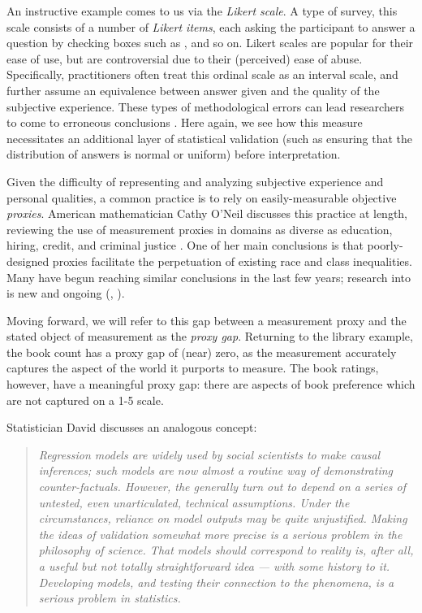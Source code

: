 \bigskip

An instructive example comes to us via the \textit{Likert scale}. 
A type of survey, this scale consists of a number of \textit{Likert items}, each asking the participant to answer a question by checking boxes such as ,  and so on.
Likert scales are popular for their ease of use, but are controversial due to their (perceived) ease of abuse.
Specifically, practitioners often treat this ordinal scale as an interval scale, and further assume an equivalence between answer given and the quality of the subjective experience.
These types of methodological errors can lead researchers to come to erroneous conclusions \citep{jamieson:2004}.
Here again, we see how this measure necessitates an additional layer of statistical validation (such as ensuring that the distribution of answers is normal or uniform) before interpretation. 

\bigskip

Given the difficulty of representing and analyzing subjective experience and personal qualities, a common practice is to rely on easily-measurable objective \textit{proxies}.
American mathematician Cathy O'Neil discusses this practice at length, reviewing the use of measurement proxies in domains as diverse as education, hiring, credit, and criminal justice \citep{oneil}.
One of her main conclusions is that poorly-designed proxies facilitate the perpetuation of existing race and class inequalities.
Many have begun reaching similar conclusions in the last few years; research into  is new and ongoing (\cite{tramer}, \cite{friedler}).

Moving forward, we will refer to this gap between a measurement proxy and the stated object of measurement as the \textit{proxy gap}.
Returning to the library example, the book count has a proxy gap of (near) zero, as the measurement accurately captures the aspect of the world it purports to measure.
The book ratings, however, have a meaningful proxy gap: there are aspects of book preference which are not captured on a 1-5 scale.

Statistician David \citet{freedman} discusses an analogous concept:

\begin{quotation}
\textit{
	Regression models are widely used by social scientists to make causal inferences; such models are now almost a routine way of demonstrating counter-factuals.
	However, the  generally turn out to depend on a series of untested, even unarticulated, technical assumptions.
	Under the circumstances, reliance on model outputs may be quite unjustified.
	Making the ideas of validation somewhat more precise is a serious problem in the philosophy of science.
	That models should correspond to reality is, after all, a useful but not totally straightforward idea --- with some history to it.
	Developing models, and testing their connection to the phenomena, is a serious problem in statistics.
	}
\end{quotation}

